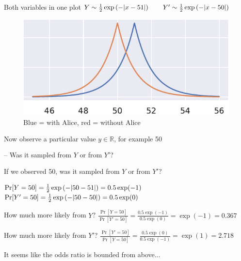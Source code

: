 \documentclass[12pt,aspectratio=169,handout]{beamer}
\begin{document}
\begin{frame}{Both variables in one plot}
$
Y \sim  \frac{1}{2} \exp \left(- \abs{x - 51} \right) \qquad
Y' \sim \frac{1}{2} \exp \left(- \abs{x - 50} \right) 
$

\begin{figure}
\centering
\includegraphics[width=0.6\linewidth]{img/laplace-02.pdf}
\caption{Blue = with Alice, red = without Alice}
\end{figure}

Now observe a particular value $y \in \mathbb{R}$, for example 50

-- Was it sampled from $Y$ or from $Y'$?

\end{frame}



\begin{frame}{If we observed 50, was it sampled from $Y$ or from $Y'$?}

$
\Pr[Y = 50] = \frac{1}{2} \exp \left(- \abs{50 - 51} \right) = 0.5 \exp(-1)
$
$
\Pr[Y' = 50] = \frac{1}{2} \exp \left(- \abs{50 - 50} \right) = 0.5 \exp(0)
$

How much more likely from $Y$?
$
\frac{\Pr[Y = 50]}{\Pr[Y' = 50]}
= \frac{0.5 \exp(-1)}{0.5 \exp(0)} = \exp(-1) = 0.367
$

How much more likely from $Y'$?
$
\frac{\Pr[Y' = 50]}{\Pr[Y = 50]}
= \frac{0.5 \exp(0)}{0.5 \exp(-1)} = \exp(1) = 2.718
$

It seems like the odds ratio is bounded from above...

\end{frame}
\end{document}
